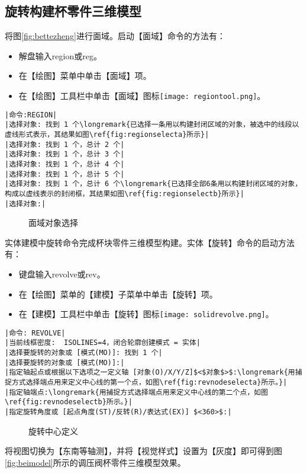 \subsection{旋转构建杯零件三维模型}
\begin{procedure}
\item 将图\ref{fig:bettezheng}进行面域。启动【面域】命令的方法有：
\begin{itemize}
\item 解盘输入region或reg。
\item 在【绘图】菜单中单击【面域】项。
\item 在【绘图】工具栏中单击【面域】图标\texttt{[image: regiontool.png]}。
\end{itemize}
\begin{lstlisting}
|命令:REGION|
|选择对象: 找到 1 个\longremark{已选择一条用以构建封闭区域的对象，被选中的线段以虚线形式表示，其结果如图\ref{fig:regionselecta}所示}|
|选择对象: 找到 1 个，总计 2 个|
|选择对象: 找到 1 个，总计 3 个|
|选择对象: 找到 1 个，总计 4 个|
|选择对象: 找到 1 个，总计 5 个|
|选择对象: 找到 1 个，总计 6 个\longremark{已选择全部6条用以构建封闭区域的对象，构成以虚线表示的封闭框，其结果如图\ref{fig:regionselectb}所示}|
|选择对象:|
\end{lstlisting}
\showremarks
\begin{figure}[htbp]
\centering
{}\hspace{30pt}
\caption{面域对象选择}
\end{figure}
\item 实体建模中旋转命令完成杯块零件三维模型构建。实体【旋转】命令的启动方法有：
\begin{itemize}
\item 键盘输入revolve或rev。
\item 在【绘图】菜单的【建模】子菜单中单击【旋转】项。
\item 在【建模】工具栏中单击【旋转】图标\texttt{[image: solidrevolve.png]}。
\end{itemize}
\begin{lstlisting}
|命令: REVOLVE|
|当前线框密度:  ISOLINES=4，闭合轮廓创建模式 = 实体|
|选择要旋转的对象或 [模式(MO)]: 找到 1 个|
|选择要旋转的对象或 [模式(MO)]:|
|指定轴起点或根据以下选项之一定义轴 [对象(O)/X/Y/Z]$<$对象$>$:\longremark{用捕捉方式选择端点用来定义中心线的第一个点，如图\ref{fig:revnodeselecta}所示。}|
|指定轴端点:\longremark{用捕捉方式选择端点用来定义中心线的第二个点，如图\ref{fig:revnodeselectb}所示。}|
|指定旋转角度或 [起点角度(ST)/反转(R)/表达式(EX)] $<360>$:|
\end{lstlisting}
\showremarks
\begin{figure}[htbp]
\centering
{}\hspace{30pt}
\caption{旋转中心定义}
\end{figure}
\item 将视图切换为【东南等轴测】，并将【视觉样式】设置为【灰度】即可得到图\ref{fig:beimodel}所示的调压阀杯零件三维模型效果。


\end{procedure}
